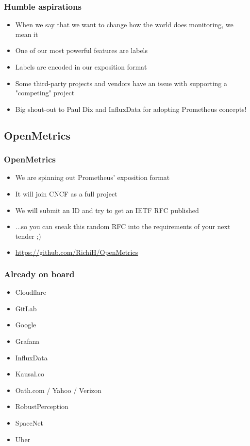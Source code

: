 \documentclass[t]{beamer}
\begin{document}
\begin{frame}
	\frametitle{Humble aspirations}
	\begin{itemize}
		\item When we say that we want to change how the world does monitoring, we mean it
		\item One of our most powerful features are labels
		\item Labels are encoded in our exposition format
		\item Some third-party projects and vendors have an issue with supporting a "competing" project
		\item Big shout-out to Paul Dix and InfluxData for adopting Prometheus concepts!
	\end{itemize}
\end{frame}


\subsection{OpenMetrics}

\begin{frame}
	\frametitle{OpenMetrics}
	\begin{itemize}
		\item We are spinning out Prometheus' exposition format
		\item It will join CNCF as a full project
		\item We will submit an ID and try to get an IETF RFC published
		\item ...so you can sneak this random RFC into the requirements of your next tender ;)
		\item \url{https://github.com/RichiH/OpenMetrics}
	\end{itemize}
\end{frame}

\begin{frame}
	\frametitle{Already on board}
	\begin{itemize}
		\item Cloudflare
		\item GitLab
		\item Google
		\item Grafana
		\item InfluxData
		\item Kausal.co
		\item Oath.com / Yahoo / Verizon
		\item RobustPerception
		\item SpaceNet
		\item Uber
	\end{itemize}
\end{frame}
\end{document}
